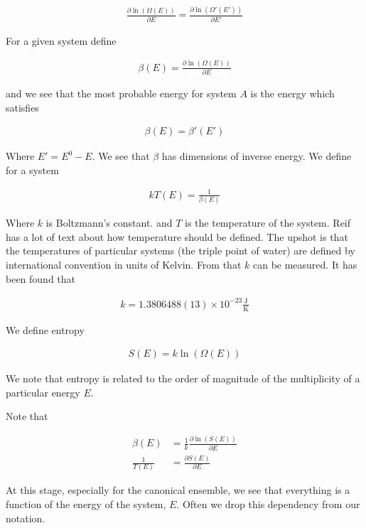 \documentclass[12pt]{article}
\begin{document}
\begin{align}
\frac{\partial \ln(\Omega(E))}{\partial E} = \frac{\partial \ln(\Omega'(E'))}{\partial E'}
\end{align}

For a given system define

\begin{align}
\beta(E) = \frac{\partial \ln(\Omega(E))}{\partial E}
\end{align}

and we see that the most probable energy for system $A$ is the energy which satisfies

\begin{align}
\beta(E) = \beta'(E')
\end{align}

Where $E' = E^0-E$. We see that $\beta$ has dimensions of inverse energy. We define for a system

\begin{align}
k T(E) = \frac{1}{\beta(E)}
\end{align}

Where $k$ is Boltzmann's constant. and $T$ is the temperature of the system. Reif has a lot of text about how temperature should be defined. The upshot is that the temperatures of particular systems (the triple point of water) are defined by international convention in units of Kelvin. From that $k$ can be measured. It has been found that

\begin{align}
k = 1.3806488(13) \times 10^{-23} \frac{\text{J}}{\text{K}}
\end{align}

We define entropy

\begin{align}
S(E) = k \ln(\Omega(E))
\end{align}

We note that entropy is related to the order of magnitude of the multiplicity of a particular energy $E$.

Note that

\begin{align}
\beta(E) &= \frac{1}{k} \frac{\partial \ln(S(E))}{\partial E}\\
\frac{1}{T(E)} &= \frac{\partial S(E)}{\partial E}
\end{align}

At this stage, especially for the canonical ensemble, we see that everything is a function of the energy of the system, $E$. Often we drop this dependency from our notation.
\end{document}
